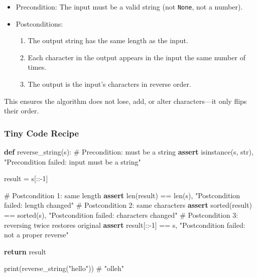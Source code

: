 \documentclass[
  letterpaper,
  DIV=11,
  numbers=noendperiod]{scrreprt}
\newenvironment{Shaded}{\begin{snugshade}}{\end{snugshade}}
\newcommand{\BuiltInTok}[1]{\textcolor[rgb]{0.00,0.23,0.31}{#1}}
\newcommand{\CommentTok}[1]{\textcolor[rgb]{0.37,0.37,0.37}{#1}}
\newcommand{\ControlFlowTok}[1]{\textcolor[rgb]{0.00,0.23,0.31}{\textbf{#1}}}
\newcommand{\DecValTok}[1]{\textcolor[rgb]{0.68,0.00,0.00}{#1}}
\newcommand{\KeywordTok}[1]{\textcolor[rgb]{0.00,0.23,0.31}{\textbf{#1}}}
\newcommand{\NormalTok}[1]{\textcolor[rgb]{0.00,0.23,0.31}{#1}}
\newcommand{\OperatorTok}[1]{\textcolor[rgb]{0.37,0.37,0.37}{#1}}
\newcommand{\StringTok}[1]{\textcolor[rgb]{0.13,0.47,0.30}{#1}}
\providecommand{\tightlist}{%
  \setlength{\itemsep}{0pt}\setlength{\parskip}{0pt}}
\begin{document}
\begin{itemize}
\item
  Precondition: The input must be a valid string (not \texttt{None}, not
  a number).
\item
  Postconditions:

  \begin{enumerate}
  \def\labelenumi{\arabic{enumi}.}
  \tightlist
  \item
    The output string has the same length as the input.
  \item
    Each character in the output appears in the input the same number of
    times.
  \item
    The output is the input's characters in reverse order.
  \end{enumerate}
\end{itemize}

This ensures the algorithm does not lose, add, or alter characters---it
only flips their order.

\subsubsection{Tiny Code Recipe}\label{tiny-code-recipe-68}

\begin{Shaded}
\begin{Highlighting}[]
\KeywordTok{def}\NormalTok{ reverse\_string(s):}
    \CommentTok{\# Precondition: must be a string}
    \ControlFlowTok{assert} \BuiltInTok{isinstance}\NormalTok{(s, }\BuiltInTok{str}\NormalTok{), }\StringTok{"Precondition failed: input must be a string"}
    
\NormalTok{    result }\OperatorTok{=}\NormalTok{ s[::}\OperatorTok{{-}}\DecValTok{1}\NormalTok{]}
    
    \CommentTok{\# Postcondition 1: same length}
    \ControlFlowTok{assert} \BuiltInTok{len}\NormalTok{(result) }\OperatorTok{==} \BuiltInTok{len}\NormalTok{(s), }\StringTok{"Postcondition failed: length changed"}
    \CommentTok{\# Postcondition 2: same characters}
    \ControlFlowTok{assert} \BuiltInTok{sorted}\NormalTok{(result) }\OperatorTok{==} \BuiltInTok{sorted}\NormalTok{(s), }\StringTok{"Postcondition failed: characters changed"}
    \CommentTok{\# Postcondition 3: reversing twice restores original}
    \ControlFlowTok{assert}\NormalTok{ result[::}\OperatorTok{{-}}\DecValTok{1}\NormalTok{] }\OperatorTok{==}\NormalTok{ s, }\StringTok{"Postcondition failed: not a proper reverse"}
    
    \ControlFlowTok{return}\NormalTok{ result}

\BuiltInTok{print}\NormalTok{(reverse\_string(}\StringTok{"hello"}\NormalTok{))  }\CommentTok{\# "olleh"}
\end{Highlighting}
\end{Shaded}
\end{document}
